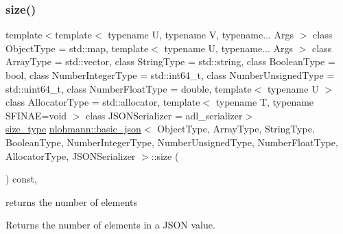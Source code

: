 \subsubsection{\texorpdfstring{size()}{size()}}
{\footnotesize\ttfamily template$<$template$<$ typename U, typename V, typename... Args $>$ class Object\+Type = std\+::map, template$<$ typename U, typename... Args $>$ class Array\+Type = std\+::vector, class String\+Type  = std\+::string, class Boolean\+Type  = bool, class Number\+Integer\+Type  = std\+::int64\+\_\+t, class Number\+Unsigned\+Type  = std\+::uint64\+\_\+t, class Number\+Float\+Type  = double, template$<$ typename U $>$ class Allocator\+Type = std\+::allocator, template$<$ typename T, typename S\+F\+I\+N\+A\+E=void $>$ class J\+S\+O\+N\+Serializer = adl\+\_\+serializer$>$ \\
\mbox{\hyperlink{classnlohmann_1_1basic__json_a39f2cd0b58106097e0e67bf185cc519b}{size\+\_\+type}} \mbox{\hyperlink{classnlohmann_1_1basic__json}{nlohmann\+::basic\+\_\+json}}$<$ Object\+Type, Array\+Type, String\+Type, Boolean\+Type, Number\+Integer\+Type, Number\+Unsigned\+Type, Number\+Float\+Type, Allocator\+Type, J\+S\+O\+N\+Serializer $>$\+::size (\begin{DoxyParamCaption}{ }\end{DoxyParamCaption}) const\hspace{0.3cm}{\ttfamily [inline]}, {\ttfamily [noexcept]}}



returns the number of elements 

Returns the number of elements in a J\+S\+ON value.

